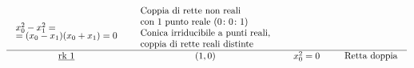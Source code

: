 \begin{theorema}
\begin{enumerate}
\begin{equation*}
\begin{array}{ccll}
\begin{array}{l}
		\\[-1mm]
		x_0^2-x_1^2=\\[-0.75ex]
		=(x_0-x_1)(x_0+x_1)=0
		\end{array} & \begin{array}{l}
		\begin{array}{l}
		\text{Coppia di rette non reali} \\
		\text{con } 1 \text{ punto reale } (0\colon 0\colon 1)
		\end{array} \\%
		\begin{array}{l}
		\text{Conica irriducibile a punti reali,} \\
		\text{coppia di rette reali distinte}
		\end{array}
		\end{array} \\[2mm] \hline %
		\underline{\rk 1} & (1,0) & \begin{array}{l}
			\\[-4mm]
			x_0^2=0
		\end{array} &\ \ \begin{array}{l}
		\text{Retta doppia}
	\end{array}	
\end{array}	
	\end{equation*}
	\end{enumerate}
\end{theorema}

